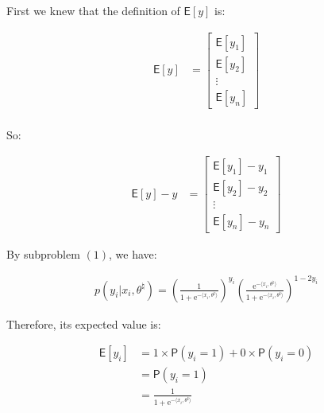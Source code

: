 \documentclass{article}
\begin{document}
First we knew that the definition of $\mathsf{E} [ y ]$ is:

\begin{align*}
    \mathsf{E} [ y ] 
    &= \begin{bmatrix}
        \mathsf{E} [ y_1 ] \\
        \mathsf{E} [ y_2 ] \\
        \vdots \\
        \mathsf{E} [ y_n ]
    \end{bmatrix} \\
\end{align*}

So:

\begin{align*}
    \mathsf{E} [ y ] - y 
    &= \begin{bmatrix}
        \mathsf{E} [ y_1 ] - y_1 \\
        \mathsf{E} [ y_2 ] - y_2 \\
        \vdots \\
        \mathsf{E} [ y_n ] - y_n
    \end{bmatrix}
\end{align*}

\begin{comment}
    Thus, to show $(2)$ is equivalent to showing:
    
    \begin{align*}
    \frac{(1 - 2y_i)\mathrm{e}^{-z_i}}{1 + \mathrm{e}^{-z_i}} = \mathsf{E} [ y_i ] - y_i \qquad \forall i \in [n] \quad \text{ where } z_i = 2(y_i - \frac{1}{2})\langle x_i, \theta^{\natural} \rangle \tag{3}
    \end{align*}
\end{comment}

By subproblem $(1)$, we have:

\begin{align*}
    p(y_i | x_i, \theta^{\natural}) = \left( \frac{1}{1 + \mathrm{e}^{-\langle x_i, \theta^{\natural} \rangle}} \right)^{y_i} \left( \frac{\mathrm{e}^{-\langle x_i, \theta^{\natural} \rangle}}{1 + \mathrm{e}^{-\langle x_i, \theta^{\natural} \rangle}} \right)^{1 - 2y_i}
\end{align*}

Therefore, its expected value is:

\begin{align*}
    \mathsf{E} [ y_i ] 
    &= 1 \times \mathsf{P} ( y_i = 1 ) + 0 \times \mathsf{P} ( y_i = 0 ) \\
    &= \mathsf{P} ( y_i = 1 ) \\
    &= \frac{1}{1 + \mathrm{e}^{-\langle x_i, \theta^{\natural} \rangle}}
\end{align*}
\end{document}
